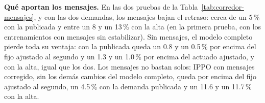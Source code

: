 \noindent\textbf{Qué aportan los mensajes.} En las dos pruebas de la
Tabla~\ref{tab:corredor-mensajes}, y con las dos demandas, los mensajes
bajan el retraso: cerca de un 5\,\% con la publicada y entre un 8 y un
13\,\% con la alta (en la primera prueba, con los entrenamientos con
mensajes sin estabilizar). Sin mensajes, el modelo completo pierde toda
su ventaja: con la publicada queda un 0.8 y un 0.5\,\% por encima del
fijo ajustado al segundo y un 1.3 y un 1.0\,\% por encima del actuado
ajustado, y con la alta, igual que los dos. Los mensajes no bastan
solos: IPPO con mensajes corregido, sin los demás cambios del modelo
completo, queda por encima del fijo ajustado al segundo, un 4.5\,\% con
la demanda publicada y un 11.6 y un 11.7\,\% con la alta.

